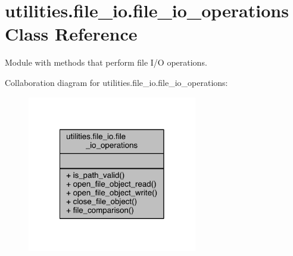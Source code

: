 \hypertarget{classutilities_1_1file__io_1_1file__io__operations}{}\section{utilities.\+file\+\_\+io.\+file\+\_\+io\+\_\+operations Class Reference}
\label{classutilities_1_1file__io_1_1file__io__operations}


Module with methods that perform file I/\+O operations.  




Collaboration diagram for utilities.\+file\+\_\+io.\+file\+\_\+io\+\_\+operations\+:
\nopagebreak
\begin{figure}[H]
\begin{center}
\leavevmode
\includegraphics[width=210pt]{db/d83/classutilities_1_1file__io_1_1file__io__operations__coll__graph}
\end{center}
\end{figure}
